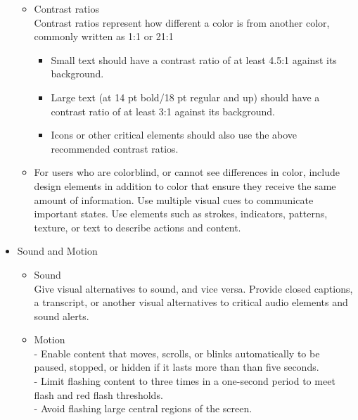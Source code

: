 \begin{itemize}
\begin{itemize}
       \item Contrast ratios \\
       Contrast ratios represent how different a color is from another color, commonly written as 1:1 or 21:1
       \begin{itemize}
         \item Small text should have a contrast ratio of at least 4.5:1 against its background.
         \item Large text (at 14 pt bold/18 pt regular and up) should have a contrast ratio of at least 3:1 against its background.
         \item Icons or other critical elements should also use the above recommended contrast ratios.

       \end{itemize}
       \item{For users who are colorblind, or cannot see differences in color, include design elements in addition to color that ensure they receive the same amount of information. Use multiple visual cues to communicate important states. Use elements such as strokes, indicators, patterns, texture, or text to describe actions and content.}
     \end{itemize}
    \item{Sound and Motion}
    	\begin{itemize}
        	\item{Sound\\Give visual alternatives to sound, and vice versa. Provide closed captions, a transcript, or another visual alternatives to critical audio elements and sound alerts.}
            \item{Motion\\- Enable content that moves, scrolls, or blinks automatically to be paused, stopped, or hidden if it lasts more than than five seconds.\\
- Limit flashing content to three times in a one-second period to meet flash and red flash thresholds.\\
- Avoid flashing large central regions of the screen.}
        \end{itemize}


\end{itemize}
